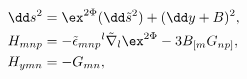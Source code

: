 \begin{equation}
\label{explictd=5ex}
\begin{aligned}
   \dd s^2 &= \ex^{2\Phi}(\dd\tilde s^2)+(\dd y+B)^2 , \\
   H_{mnp} &= -\tilde \epsilon_{mnp}{}^l\tilde{\nabla}_l
      \ex^{2\Phi}-3B_{[m}G_{np]} , \\ 
   H_{ymn} &= -G_{mn} ,
\end{aligned}
\end{equation}

